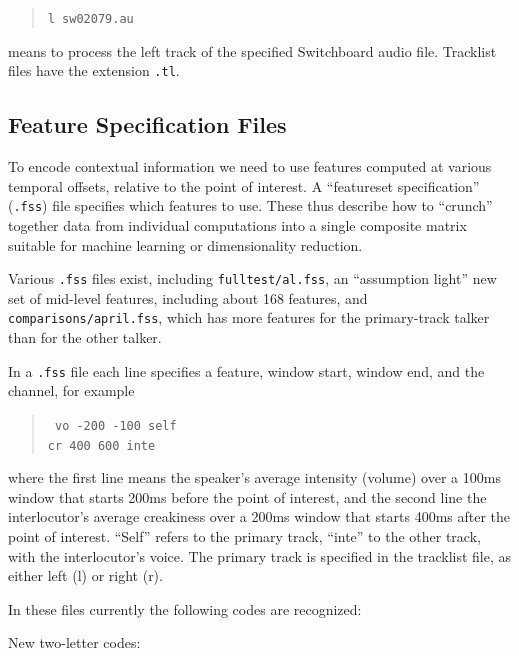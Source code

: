 \documentclass[11pt]{article}
\begin{document}
\begin{quote}
\verb+l sw02079.au+
\end{quote}

means to process the left track of the specified Switchboard audio
file.  Tracklist files have the extension {\tt .tl}. 


\subsection{Feature Specification Files}     \label{featurespec-files}

To encode contextual information we need to use features computed at
various temporal offsets, relative to the point of interest.  A
``featureset specification'' ({\tt .fss}) file specifies which
features to use.  These thus describe how to ``crunch'' together data
from individual computations into a single composite matrix suitable
for machine learning or dimensionality reduction.

Various {\tt .fss} files exist, including {\tt fulltest/al.fss}, an
``assumption light'' new set of mid-level features, including about
168 features, and {\tt comparisons/april.fss}, which has more features
for the primary-track talker than for the other talker. 


In a {\tt .fss} file each line specifies a feature, window start,
window end, and the channel, for example

\begin{quote}{\tt 
    vo   -200   -100 self  \\
    cr    400    600 inte
}\end{quote}

where the first line means the speaker's average intensity (volume)
over a 100ms window that starts 200ms before the point of interest,
and the second line the interlocutor's average creakiness over a 200ms
window that starts 400ms after the point of interest.  ``Self'' refers
to the primary track, ``inte'' to the other track, with the
interlocutor's voice.  The primary track is specified in the tracklist
file, as either left (l) or right (r).


In these files currently the following codes are recognized:

New two-letter codes: 
\end{document}
